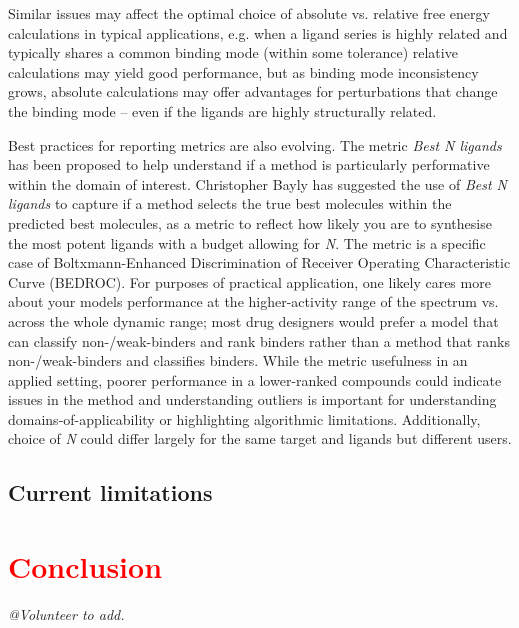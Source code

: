 \documentclass[9pt,bestpractices,pubversion]{livecoms}
\makeatletter
\newcommand{\tocred}[1]{\textcolor{red}{#1}}
\newcommand{\tocsectioncomment}[1]{%
  \addtocontents{toc}{%
    {\leftskip \cftsecindent\relax
     \advance\leftskip \cftsecnumwidth\relax
     \rightskip \@tocrmarg\relax
     \textit{#1}\protect\par}}%
  \textit{#1}\par}
\makeatother
\begin{document}
Similar issues may affect the optimal choice of absolute vs. relative free energy calculations in typical applications, e.g. when a ligand series is highly related and typically shares a common binding mode (within some tolerance) relative calculations may yield good performance, but as binding mode inconsistency grows, absolute calculations may offer advantages for perturbations that change the binding mode -- even if the ligands are highly structurally related. 

Best practices for reporting metrics are also evolving. The metric \textit{Best N ligands} has been proposed to help understand if a method is particularly performative within the domain of interest. Christopher Bayly has suggested the use of \textit{Best N ligands} to capture if a method selects the true best molecules within the predicted best molecules, as a metric to reflect how likely you are to synthesise the most potent ligands with a budget allowing for \textit{N}. The metric is a specific case of Boltxmann-Enhanced Discrimination of Receiver Operating Characteristic Curve (BEDROC)\cite{swamidass2009influence}. For purposes of practical application, one likely cares more about your models performance at the higher-activity range of the spectrum vs. across the whole dynamic range; most drug designers would prefer a model that can classify non-/weak-binders and rank binders rather than a method that ranks non-/weak-binders and classifies binders. While the metric usefulness in an applied setting, poorer performance in a lower-ranked compounds could indicate issues in the method and understanding outliers is important for understanding domains-of-applicability or highlighting algorithmic limitations. Additionally, choice of \textit{N} could differ largely for the same target and ligands but different users.


\subsection{Current limitations}

\section{\tocred{Conclusion}}
\tocsectioncomment{@Volunteer to add.}
\label{sec:conclusion}

\end{document}
